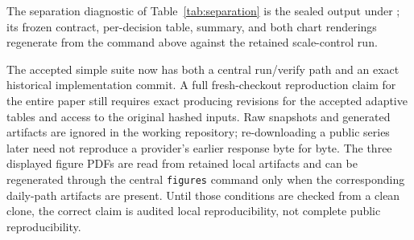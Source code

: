 \documentclass[11pt]{article}
\begin{document}
The separation diagnostic of Table~\ref{tab:separation} is the sealed output
 under
; its frozen contract, per-decision
table, summary, and both chart renderings regenerate from the command above
against the retained scale-control run.

The accepted simple suite now has both a central run/verify path and an exact
historical implementation commit. A full fresh-checkout reproduction claim for
the entire paper still requires exact producing revisions for the accepted
adaptive tables and access to the original hashed inputs. Raw snapshots and
generated artifacts are ignored in the working repository; re-downloading a
public series later need not reproduce a provider's earlier response byte for
byte. The three displayed figure PDFs are read from retained local artifacts
and can be regenerated through the central \texttt{figures} command only when
the corresponding daily-path artifacts are present. Until those conditions are
checked from a clean clone, the correct claim is audited local reproducibility,
not complete public reproducibility.
\end{document}
